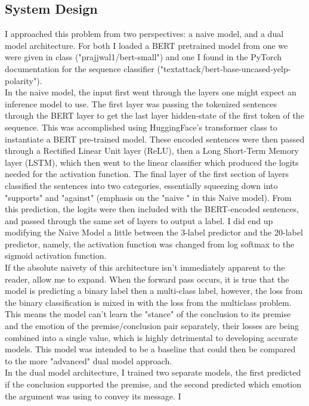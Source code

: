 \documentclass[11pt,a4paper]{article}
\begin{document}
\subsection{System Design}
I approached this problem from two perspectives: a naive model, and a dual model architecture. For both I loaded
a BERT pretrained model from one we were given in class ("prajjwal1/bert-small") and one I found in the PyTorch 
documentation for the sequence classifier ("textattack/bert-base-uncased-yelp-polarity").\\
\indent In the naive model, the input first went through the layers one might expect an inference model to use. 
The first layer was passing the tokenized sentences through the BERT layer to get the last layer hidden-state of 
the first token of the sequence. This was accomplished using HuggingFace's transformer class to instantiate a BERT
pre-trained model. These encoded sentences were then passed through a Rectified Linear Unit layer (ReLU), then a Long Short-Term 
Memory layer (LSTM), which then went to the linear classifier which produced the logits needed for the 
activation function. The final layer of the first section of layers classified the sentences into two categories, 
essentially squeezing down into "supports" and "against" (emphasis on the "naive " in this Naive model). From 
this prediction, the logits were then included with the BERT-encoded sentences, and passed through the same set of 
layers to output a label. I did end up modifying the Naive Model a little between the 3-label predictor and the 
20-label predictor, namely, the activation function was changed from log softmax to the sigmoid activation 
function. \\
\indent If the absolute naivety of this architecture isn't immediately apparent to the reader, allow me to expand.
When the forward pass occurs, it is true that the model is predicting a binary label then a multi-class label, 
however, the loss from the binary classification is mixed in with the loss from the multiclass problem. This means 
the model can't learn the "stance" of the conclusion to its premise and the emotion of the premise/conclusion pair 
separately, their losses are being combined into a single value, which is highly detrimental to developing accurate 
models. This model was intended to be a baseline that could then be compared to the more "advanced" dual model 
approach.\\
\indent In the dual model architecture, I trained two separate models, the first predicted if the conclusion 
supported the premise, and the second predicted which emotion the argument was using to convey its message. I
\end{document}
